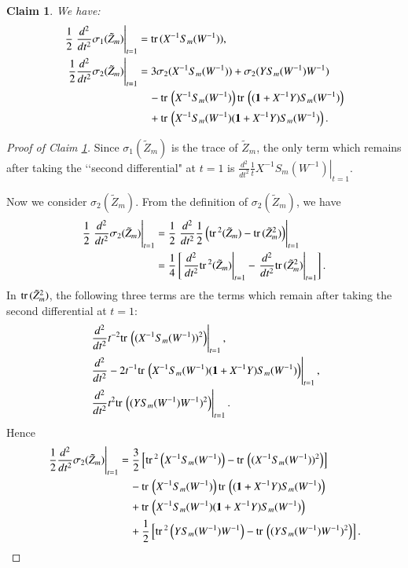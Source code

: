 \documentclass[a4paper]{amsart}
\theoremstyle{plain}
\newtheorem{claim}[theorem]{Claim}
\theoremstyle{definition}
\theoremstyle{remark}
\newcommand{\I}{\mathbf{1}}
\newcommand{\trace}{{\rm tr}\,}
\begin{document}
\begin{claim}\label{claim:sec_diffs}
We have:
\begin{align}
\frac{1}{2} \left. \frac{d^2}{dt^2}\sigma_1(\tilde Z_m) \right|_{t=1}
&= 
\trace(X^{-1}S_m(W^{-1})),  \label{sec_dif_sigma_1}\\
\left.\frac{1}{2}\frac{d^2}{dt^2} \sigma_2(\tilde Z_m) \right|_{t=1} 
&= 3\sigma_2(X^{-1}S_m(W^{-1})) + \sigma_2(YS_m(W^{-1})W^{-1}) \label{sec_dif_sigma_2}\\
&\quad -\trace\left(X^{-1}S_m(W^{-1})\right)\trace\left((\I+X^{-1}Y)S_m(W^{-1})\right) \nonumber\\
&\quad + \trace\left(X^{-1}S_m(W^{-1})(\I+X^{-1}Y)S_m(W^{-1})\right).\nonumber 
\end{align}
\end{claim}
\begin{proof}[Proof of Claim \ref{claim:sec_diffs}]
Since $\sigma_1(\tilde Z_m)$ is the trace of $\tilde Z_m$, the
only term which remains after taking the \lq\lq second differential" at $t = 1$ is $\left. \frac{d^2}{dt^2}\frac{1}{t} X^{-1} S_m(W^{-1}) \right|_{t=1}$.

Now we consider $\sigma_2(\tilde Z_m)$.
From the definition of $\sigma_2(\tilde Z_m)$,
we have 
%
\begin{align*}
\frac{1}{2} 
\left. \frac{d^2}{dt^2}
\sigma_2(\tilde Z_m)
\right|_{t=1} 
&=
    \frac{1}{2}
        \left. \frac{d^2}{dt^2}
        \frac{1}{2}
        \left( 
            \trace^2(\tilde Z_m) -\trace ({\tilde Z_m}^2) 
        \right)
        \right|_{t=1}\\ 
&=
    \frac{1}{4}
    \left[  
    \left. \frac{d^2}{dt^2}\trace^2(\tilde Z_m) \right|_{t=1}
     - \left.\frac{d^2}{dt^2} \trace({\tilde Z_m}^2)\right|_{t=1}
    \right].
\end{align*}
%
In $\trace({\tilde Z_m}^2)$, 
the following three terms
are the terms which remain after taking the second differential at $t=1$:
%
\begin{eqnarray*}
&\left. \frac{d^2}{dt^2}t^{-2}\trace\left( (X^{-1}S_m(W^{-1}))^2 \right)\right|_{t=1},\\
&\left. \frac{d^2}{dt^2}-2t^{-1}\trace\left( X^{-1}S_m(W^{-1}) (\I+X^{-1}Y)S_m(W^{-1}) \right)\right|_{t=1},\\
&\left. \frac{d^2}{dt^2}t^2 \trace\left( (YS_m(W^{-1})W^{-1})^2 \right)\right|_{t=1}.
\end{eqnarray*}
%
Hence
\begin{align*} 
\left.\frac{1}{2}\frac{d^2}{dt^2} \sigma_2(\tilde Z_m) \right|_{t=1}
&=\frac{3}{2}
    \left[
        \trace^2\left(X^{-1}S_m(W^{-1})\right) - \trace\left( (X^{-1}S_m(W^{-1}))^2 \right) 
    \right] \\
&\quad -\trace\left(X^{-1}S_m(W^{-1})\right)\trace\left((\I+X^{-1}Y)S_m(W^{-1})\right) \\
&\quad + \trace\left(X^{-1}S_m(W^{-1})(\I+X^{-1}Y)S_m(W^{-1})\right)\\
&\quad +\frac{1}{2}
    \left[
        \trace^2\left(YS_m(W^{-1})W^{-1}\right) - \trace\left((YS_m(W^{-1})W^{-1})^2\right)
    \right].
\end{align*}
\end{proof}
\end{document}
